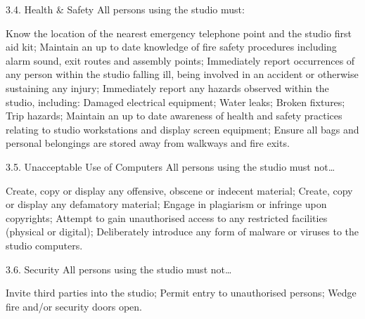 3.4.	Health \& Safety
All persons using the studio must:

Know the location of the nearest emergency telephone point and the studio first aid kit;
Maintain an up to date knowledge of fire safety procedures including alarm sound, exit routes and assembly points;
Immediately report occurrences of any person within the studio falling ill, being involved in an accident or otherwise sustaining any injury;
Immediately report any hazards observed within the studio, including:
Damaged electrical equipment;
Water leaks;
Broken fixtures;
Trip hazards;
Maintain an up to date awareness of health and safety practices relating to studio workstations and display screen equipment;
Ensure all bags and personal belongings are stored away from walkways and fire exits.

3.5.	Unacceptable Use of Computers
All persons using the studio must not…

Create, copy or display any offensive, obscene or indecent material;
Create, copy or display any defamatory material;
Engage in plagiarism or infringe upon copyrights;
Attempt to gain unauthorised access to any restricted facilities (physical or digital);
Deliberately introduce any form of malware or viruses to the studio computers.

3.6.	Security
All persons using the studio must not…

Invite third parties into the studio;
Permit entry to unauthorised persons;
Wedge fire and/or security doors open.

